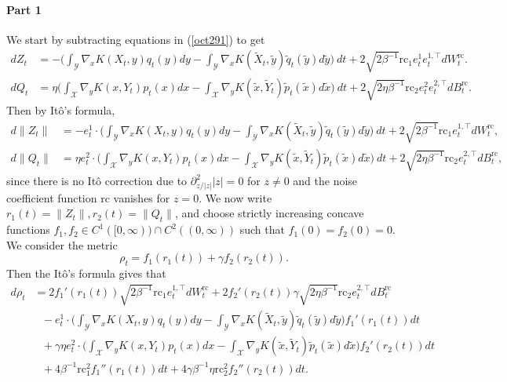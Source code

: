 \documentclass[11pt]{article}
\newcommand{\1}{\mathds{1}}
\renewcommand{\d}{\partial}
\newcommand{\frc}{\text{rc}}
\begin{document}
\paragraph{Part 1} We start by subtracting equations in (\ref{oct291}) to get
\begin{subequations}
    \begin{align}
        dZ_t &= -\Big(\int_{\mathcal{Y}} \nabla_x K(X_t,y) q_t(y) dy -\int_{\mathcal{Y}} \nabla_x K(\tilde{X}_t,\tilde{y}) \tilde{q}_t(\tilde{y}) d\tilde{y}\Big)~dt+2\sqrt{2\beta^{-1}}\frc_1 e_t^1e_t^{1,\top} dW_t^{\frc}.\\
        dQ_t & = \eta \Big(\int_{\mathcal{X}} \nabla_y K(x,Y_t) p_t(x) dx-\int_{\mathcal{X}} \nabla_y K(\tilde{x},\tilde{Y}_t) \tilde{p}_t(\tilde{x}) d\tilde{x}\Big)~ dt+2\sqrt{2\eta\beta^{-1}}\frc_2 e_t^2e_t^{2,\top} dB_t^{\frc}.
    \end{align}
\end{subequations}
Then by It\^{o}'s formula, 
\begin{equation*}
    \begin{aligned}
d\|Z_t\| &= -e_t^1\cdot \Big(\int_{\mathcal{Y}} \nabla_x K(X_t,y) q_t(y) dy -\int_{\mathcal{Y}} \nabla_x K(\tilde{X}_t,\tilde{y}) \tilde{q}_t(\tilde{y}) d\tilde{y}\Big)~dt+2\sqrt{2\beta^{-1}}\frc_1 e_t^{1,\top} dW_t^{\frc},\\
d\|Q_t\| & = \eta e_t^2 \cdot \Big(\int_{\mathcal{X}} \nabla_y K(x,Y_t) p_t(x) dx-\int_{\mathcal{X}} \nabla_y K(\tilde{x},\tilde{Y}_t) \tilde{p}_t(\tilde{x}) d\tilde{x}\Big)~ dt+ 2 \sqrt{2\eta\beta^{-1}}\frc_2 e_t^{2,\top} dB_t^{\frc},
    \end{aligned}
\end{equation*}
since there is no It\^{o} correction due to $\d^2_{z/|z|}|z|=0$ for $z\neq 0$ and the noise coefficient function $\frc$ vanishes for $z = 0$. 
We now write $r_1(t)  = \|Z_t \|, r_2(t)= \| Q_t\|$, and choose strictly increasing concave functions $f_1, f_2 \in C^1([0,\infty))\cap  C^2((0,\infty)) $ such that $f_1(0) = f_2(0)=0$. We consider the metric
\begin{equation}
    \rho_t =  f_1(r_1(t)) +  \gamma f_2(r_2(t)).
\end{equation}
Then the It\^{o}'s formula gives that
\begin{equation}\label{nov1_1}
\begin{aligned}
    d\rho_t &= 2f_1'(r_1(t)) \sqrt{2\beta^{-1}}\frc_1 e_t^{1,\top} dW_t^{\frc} + 2 f_2'(r_2(t))\gamma \sqrt{2\eta\beta^{-1}}\frc_2e_t^{2,\top} dB_t^{\frc}\\
    &~~~ -e_t^1\cdot \Big(\int_{\mathcal{Y}} \nabla_x K(X_t,y) q_t(y) dy -\int_{\mathcal{Y}} \nabla_x K(\tilde{X}_t,\tilde{y}) \tilde{q}_t(\tilde{y}) d\tilde{y}\Big)f_1'(r_1(t)) dt\\
    &~~~+\gamma \eta e_t^2 \cdot \Big(\int_{\mathcal{X}} \nabla_y K(x,Y_t) p_t(x) dx-\int_{\mathcal{X}} \nabla_y K(\tilde{x},\tilde{Y}_t) \tilde{p}_t(\tilde{x}) d\tilde{x}\Big)f_2'(r_2(t)) dt\\
    &~~~+ 4\beta^{-1}\frc_1^2 f_1''(r_1(t)) dt + 4\gamma\beta^{-1}\eta  \frc_2^2 f_2''(r_2(t)) dt.
\end{aligned}
\end{equation}
\end{document}
